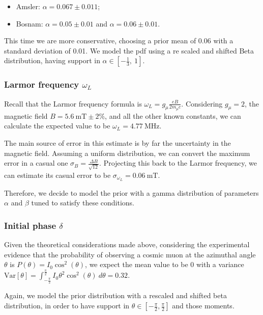 \documentclass[
]{article}
\providecommand{\tightlist}{%
  \setlength{\itemsep}{0pt}\setlength{\parskip}{0pt}}
\begin{document}
\begin{itemize}
\tightlist
\item
  Amsler: \(\alpha = 0.067 \pm 0.011\);
\item
  Bosnam: \(\alpha = 0.05  \pm 0.01\) and \(\alpha = 0.06  \pm 0.01\).
\end{itemize}

This time we are more conservative, choosing a prior mean of 0.06 with a
standard deviation of 0.01. We model the pdf using a re scaled and
shifted Beta distribution, having support in
\(\alpha\in \left[-\frac 1 3,\ 1 \right]\).

\subsubsection{\texorpdfstring{Larmor frequency
\(\omega_L\)}{Larmor frequency \textbackslash omega\_L}}\label{larmor-frequency-omega_l}

Recall that the Larmor frequency formula is
\(\omega_L = g_{\mu} \frac {eB} {2 m_{\mu} c}\). Considering
\(g_{\mu}=2\), the magnetic field \(B=5.6\ \text{mT} \pm 2\%\), and all
the other known constants, we can calculate the expected value to be
\(\omega_L = 4.77\ \text{MHz}\).

The main source of error in this estimate is by far the uncertainty in
the magnetic field. Assuming a uniform distribution, we can convert the
maximum error in a casual one
\(\sigma_B = \frac {\Delta B} {\sqrt{12}}\). Projecting this back to the
Larmor frequency, we can estimate its casual error to be
\(\sigma_{\omega_L} = 0.06\ \text{mT}\).

Therefore, we decide to model the prior with a gamma distribution of
parameters \(\alpha\) and \(\beta\) tuned to satisfy these conditions.

\subsubsection{\texorpdfstring{Initial phase
\(\delta\)}{Initial phase \textbackslash delta}}\label{initial-phase-delta}

Given the theoretical considerations made above, considering the
experimental evidence that the probability of observing a cosmic muon at
the azimuthal angle \(\theta\) is \(P(\theta) = I_0 \cos^2(\theta)\), we
expect the mean value to be 0 with a variance
\(\text{Var}[\theta]= \int_{-\frac \pi 2}^{\frac \pi 2} I_0 \theta^2 \cos^2(\theta)\ d\theta = 0.32\).

Again, we model the prior distribution with a rescaled and shifted beta
distribution, in order to have support in
\(\theta \in \left [-\frac \pi 2, \frac \pi 2 \right]\) and those
moments.
\end{document}

